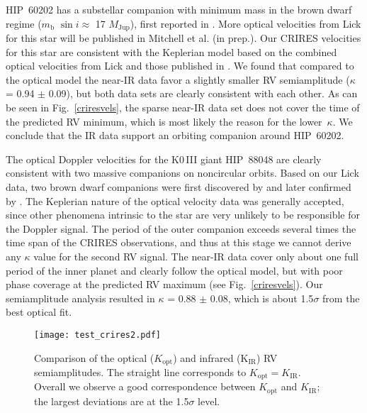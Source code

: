 \documentclass{aa}
\begin{document}
 



HIP~60202 has a substellar companion with minimum mass in the brown dwarf regime 
($m_{\mathrm{b}}$ $\sin i \approx$ 17 $M_\mathrm{Jup}$), first reported in \citet{Liu2008}. 
More optical velocities from Lick for this star will be published in Mitchell et al. (in prep.). 
Our CRIRES velocities for this star are consistent
with the Keplerian model based on the combined optical velocities from Lick and those published in \citet{Liu2008}.
We found that compared to the optical model the near-IR data favor a slightly
smaller RV semiamplitude ($\kappa$ = 0.94 $\pm$ 0.09), but both data sets are clearly consistent with each other.
As can be seen in Fig.~\ref{criresvels}, the sparse near-IR data set does not cover the time of the predicted RV minimum, which is
most likely the reason for the lower~$\kappa$.
We conclude that the IR data support an orbiting companion around HIP~60202.

The optical Doppler velocities for the K0\,III giant HIP~88048 are clearly consistent with two massive companions on noncircular orbits.
Based on our Lick data, two brown dwarf companions were first discovered by \citet{Quirrenbach} and later confirmed by \citet{Sato2012}. 
The Keplerian nature of the optical velocity data was generally accepted, since
other phenomena intrinsic to the star are very unlikely to be responsible for the Doppler signal.
The period of the outer companion exceeds several times the time span of the CRIRES observations, and thus at this stage 
we cannot derive any $\kappa$ value for the second RV signal.
The near-IR data cover only about one full period of the inner planet and clearly follow the optical model, but with 
 poor phase coverage at the predicted RV maximum (see Fig.~\ref{criresvels}). 
Our semiamplitude analysis resulted in $\kappa$ = 0.88 $\pm$ 0.08, which is about 1.5$\sigma$ from the best optical fit.


 


\begin{figure}
\texttt{[image: test\_crires2.pdf]} 
\caption{\label{fig:comp}Comparison of the optical ($K_{\mathrm{opt}}$) and infrared (K$_{\mathrm{IR}}$) 
RV semiamplitudes. The straight line corresponds to $K_{\mathrm{opt}} = K_{\mathrm{IR}}$.
Overall we observe a good correspondence between $K_{\mathrm{opt}}$ and $K_{\mathrm{IR}}$;
the largest deviations are at the 1.5$\sigma$ level.}
\end{figure}
\end{document}
